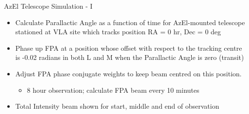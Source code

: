 \documentclass[pdf,azure,slideColor,colorBG]{prosper}
\begin{document}

\begin{slide} {AzEl Telescope Simulation - I}
\begin{small}
\begin{itemize}
\item Calculate Parallactic Angle as a function of time for AzEl-mounted
telescope stationed at VLA site which tracks position RA = 0 hr, Dec = 0 deg
\item Phase up FPA at a position whose offset with respect to the
tracking centre is -0.02 radians in both L and M when the Parallactic Angle is zero (transit)
\item Adjust FPA phase conjugate weights to keep beam centred on this
position.
\begin{itemize}
\item 8 hour observation; calculate FPA beam every 10 minutes
\end{itemize}
\item Total Intensity beam shown for start, middle and end of observation 
\end{itemize}
\end {small}
{\centering
{}
}
\end{slide}
\end{document}
